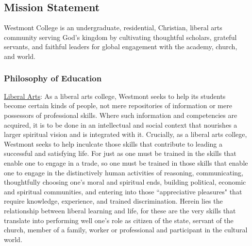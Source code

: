 \subsection{Mission Statement}
   Westmont College is an undergraduate, residential, Christian, liberal arts community serving God's kingdom by cultivating thoughtful scholars, grateful servants, and faithful leaders for global engagement with the academy, church, and world.
\subsubsection{Philosophy of Education}

\underline {Liberal Arts}: As a liberal arts college, Westmont seeks to help its students become certain kinds of people, not mere repositories of information or mere possessors of professional skills.  Where such information and competencies are acquired, it is to be done in an intellectual and social context that nourishes a larger spiritual vision and is integrated with it.  Crucially, as a liberal arts college, Westmont seeks to help inculcate those skills that contribute to leading a successful and satisfying life.  For just as one must be trained in the skills that enable one to engage in a trade, so one must be trained in those skills that enable one to engage in the distinctively human activities of reasoning, communicating, thoughtfully choosing one's moral and spiritual ends, building political, economic and spiritual communities, and entering into those ``appreciative pleasures" that require knowledge, experience, and trained discrimination. Herein lies the relationship between liberal learning and life, for these are the very skills that translate into performing well one's role as citizen of the state, servant of the church, member of a family, worker or professional and participant in the cultural world.


